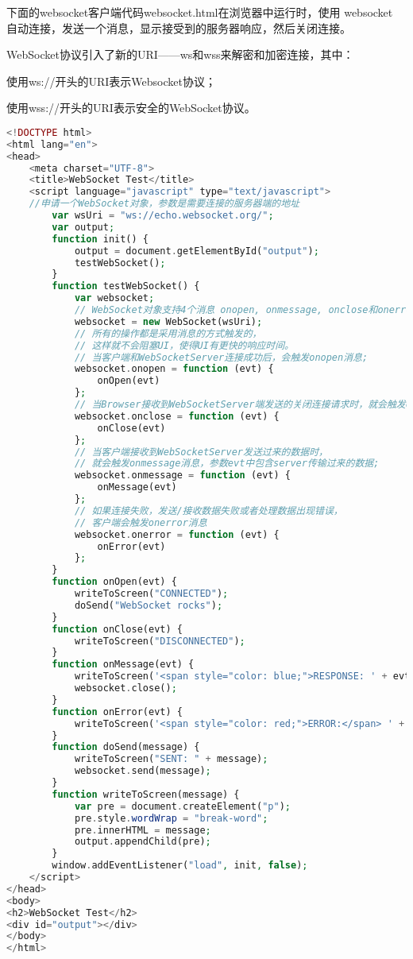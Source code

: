 下面的websocket客户端代码websocket.html在浏览器中运行时，使用 websocket 自动连接，发送一个消息，显示接受到的服务器响应，然后关闭连接。

WebSocket协议引入了新的URI——ws和wss来解密和加密连接，其中：

\begin{compactitem}
\item 使用ws://开头的URI表示Websocket协议；
\item 使用wss://开头的URI表示安全的WebSocket协议。
\end{compactitem}

\begin{lstlisting}[language=PHP,basicstyle=\ttfamily\footnotesize]
<!DOCTYPE html>
<html lang="en">
<head>
    <meta charset="UTF-8">
    <title>WebSocket Test</title>
    <script language="javascript" type="text/javascript">
	//申请一个WebSocket对象，参数是需要连接的服务器端的地址
        var wsUri = "ws://echo.websocket.org/";
        var output;
        function init() {
            output = document.getElementById("output");
            testWebSocket();
        }
        function testWebSocket() {
            var websocket;
            // WebSocket对象支持4个消息 onopen, onmessage, onclose和onerror
            websocket = new WebSocket(wsUri);
            // 所有的操作都是采用消息的方式触发的，
            // 这样就不会阻塞UI，使得UI有更快的响应时间。
            // 当客户端和WebSocketServer连接成功后，会触发onopen消息;
            websocket.onopen = function (evt) {
                onOpen(evt)
            };
            // 当Browser接收到WebSocketServer端发送的关闭连接请求时，就会触发onclose消息。
            websocket.onclose = function (evt) {
                onClose(evt)
            };
            // 当客户端接收到WebSocketServer发送过来的数据时，
            // 就会触发onmessage消息，参数evt中包含server传输过来的数据;
            websocket.onmessage = function (evt) {
                onMessage(evt)
            };
            // 如果连接失败，发送/接收数据失败或者处理数据出现错误，
            // 客户端会触发onerror消息
            websocket.onerror = function (evt) {
                onError(evt)
            };
        }
        function onOpen(evt) {
            writeToScreen("CONNECTED");
            doSend("WebSocket rocks");
        }
        function onClose(evt) {
            writeToScreen("DISCONNECTED");
        }
        function onMessage(evt) {
            writeToScreen('<span style="color: blue;">RESPONSE: ' + evt.data + '</span>');
            websocket.close();
        }
        function onError(evt) {
            writeToScreen('<span style="color: red;">ERROR:</span> ' + evt.data);
        }
        function doSend(message) {
            writeToScreen("SENT: " + message);
            websocket.send(message);
        }
        function writeToScreen(message) {
            var pre = document.createElement("p");
            pre.style.wordWrap = "break-word";
            pre.innerHTML = message;
            output.appendChild(pre);
        }
        window.addEventListener("load", init, false);
    </script>
</head>
<body>
<h2>WebSocket Test</h2>
<div id="output"></div>
</body>
</html>
\end{lstlisting}

